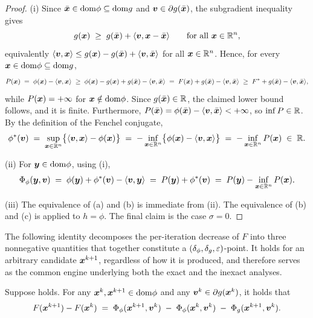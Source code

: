 \begin{proof}
(i) Since $\bar{\bm{x}}\in\mathrm{dom}\phi\subseteq\mathrm{dom} g$ and
$\bm{v}\in\partial g(\bar{\bm{x}})$, the subgradient inequality gives
\begin{equation}
    g(\bm{x})\;\ge\;g(\bar{\bm{x}})+\langle\bm{v},\bm{x}-\bar{\bm{x}}\rangle
    \qquad\text{for all }\bm{x}\in\mathbb{R}^n,
    \label{eq:g-subgrad-at-xbar}
\end{equation}
equivalently
$\langle\bm{v},\bm{x}\rangle\le g(\bm{x})-g(\bar{\bm{x}})+\langle\bm{v},\bar{\bm{x}}\rangle$
for all $\bm{x}\in\mathbb{R}^n$. Hence, for every $\bm{x}\in\mathrm{dom}\phi\subseteq\mathrm{dom} g$,
\[
    P(\bm{x})
    \;=\;
    \phi(\bm{x})-\langle\bm{v},\bm{x}\rangle
    \;\ge\;
    \phi(\bm{x})-g(\bm{x})+g(\bar{\bm{x}})-\langle\bm{v},\bar{\bm{x}}\rangle
    \;=\;
    F(\bm{x})+g(\bar{\bm{x}})-\langle\bm{v},\bar{\bm{x}}\rangle
    \;\ge\;
    F^\ast+g(\bar{\bm{x}})-\langle\bm{v},\bar{\bm{x}}\rangle,
\]
while $P(\bm{x})=+\infty$ for $\bm{x}\notin\mathrm{dom}\phi$. Since $g(\bar{\bm{x}})\in\mathbb{R}$,
the claimed lower bound follows, and it is finite. Furthermore,
$P(\bar{\bm{x}})=\phi(\bar{\bm{x}})-\langle\bm{v},\bar{\bm{x}}\rangle<+\infty$, so
$\inf\limits P\in\mathbb{R}$. By the definition of the Fenchel conjugate,
\[
    \phi^*(\bm{v})
    \;=\;
    \sup\limits_{\bm{x}\in\mathbb{R}^n}\bigl\{\langle\bm{v},\bm{x}\rangle-\phi(\bm{x})\bigr\}
    \;=\;
    -\inf\limits_{\bm{x}\in\mathbb{R}^n}\bigl\{\phi(\bm{x})-\langle\bm{v},\bm{x}\rangle\bigr\}
    \;=\;
    -\inf\limits_{\bm{x}\in\mathbb{R}^n}P(\bm{x})\;\in\;\mathbb{R} .
\]

(ii) For $\bm{y}\in\mathrm{dom}\phi$, using (i),
\[
    \Phi_\phi(\bm{y},\bm{v})
    \;=\;
    \phi(\bm{y})+\phi^*(\bm{v})-\langle\bm{v},\bm{y}\rangle
    \;=\;
    P(\bm{y})+\phi^*(\bm{v})
    \;=\;
    P(\bm{y})-\inf\limits_{\bm{x}\in\mathbb{R}^n}P(\bm{x}).
\]

(iii) The equivalence of (a) and (b) is immediate from (ii). The
equivalence of (b) and (c) is  applied to
$h=\phi$. The final claim is the case $\sigma=0$.
\end{proof}


The following identity decomposes the per-iteration decrease of $F$
into three nonnegative quantities that together constitute a
$(\delta_\phi,\delta_g,\varepsilon)$-point. It holds for an arbitrary
candidate $\bm{x}^{k+1}$, regardless of how it is produced, and therefore
serves as the common engine underlying both the exact and the
inexact analyses.

\begin{lemma}
\label{lem:dca-one-step-identity}
Suppose  holds. For any
$\bm{x}^k,\bm{x}^{k+1}\in\mathrm{dom}\phi$ and any $\bm{v}^k\in\partial g(\bm{x}^k)$, it holds that
\begin{equation}
    F(\bm{x}^{k+1})-F(\bm{x}^k)
    \;=\;
    \Phi_\phi(\bm{x}^{k+1},\bm{v}^k)
    \;-\;
    \Phi_\phi(\bm{x}^k,\bm{v}^k)
    \;-\;
    \Phi_g(\bm{x}^{k+1},\bm{v}^k).
    \label{eq:dca-one-step-identity}
\end{equation}
\end{lemma}

